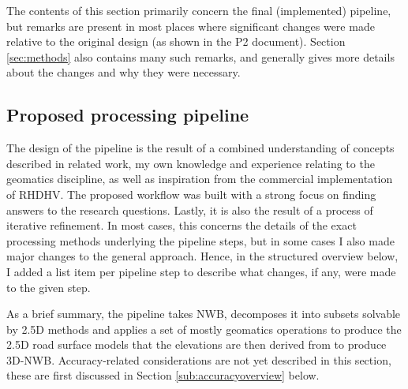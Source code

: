 The contents of this section primarily concern the final (implemented) pipeline, but remarks are present in most places where significant changes were made relative to the original design (as shown in the P2 document). Section \ref{sec:methods} also contains many such remarks, and generally gives more details about the changes and why they were necessary.

\subsection{Proposed processing pipeline}
\label{sub:pipelineoverview}

The design of the pipeline is the result of a combined understanding of concepts described in related work, my own knowledge and experience relating to the geomatics discipline, as well as inspiration from the commercial implementation of RHDHV. The proposed workflow was built with a strong focus on finding answers to the research questions. Lastly, it is also the result of a process of iterative refinement. In most cases, this concerns the details of the exact processing methods underlying the pipeline steps, but in some cases I also made major changes to the general approach. Hence, in the structured overview below, I added a list item per pipeline step to describe what changes, if any, were made to the given step.

As a brief summary, the pipeline takes NWB, decomposes it into subsets solvable by 2.5D methods and applies a set of mostly geomatics operations to produce the 2.5D road surface models that the elevations are then derived from to produce 3D-NWB. Accuracy-related considerations are not yet described in this section, these are first discussed in Section \ref{sub:accuracyoverview} below.

